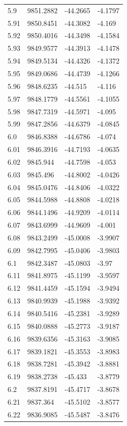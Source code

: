 \begin{table}[H]
\begin{tabular}{llll}
5.9 & 9851.2882 & -44.2665 & -4.1797 \\
5.91 & 9850.8451 & -44.3082 & -4.169 \\
5.92 & 9850.4016 & -44.3498 & -4.1584 \\
5.93 & 9849.9577 & -44.3913 & -4.1478 \\
5.94 & 9849.5134 & -44.4326 & -4.1372 \\
5.95 & 9849.0686 & -44.4739 & -4.1266 \\
5.96 & 9848.6235 & -44.515 & -4.116 \\
5.97 & 9848.1779 & -44.5561 & -4.1055 \\
5.98 & 9847.7319 & -44.5971 & -4.095 \\
5.99 & 9847.2856 & -44.6379 & -4.0845 \\
6.0 & 9846.8388 & -44.6786 & -4.074 \\
6.01 & 9846.3916 & -44.7193 & -4.0635 \\
6.02 & 9845.944 & -44.7598 & -4.053 \\
6.03 & 9845.496 & -44.8002 & -4.0426 \\
6.04 & 9845.0476 & -44.8406 & -4.0322 \\
6.05 & 9844.5988 & -44.8808 & -4.0218 \\
6.06 & 9844.1496 & -44.9209 & -4.0114 \\
6.07 & 9843.6999 & -44.9609 & -4.001 \\
6.08 & 9843.2499 & -45.0008 & -3.9907 \\
6.09 & 9842.7995 & -45.0406 & -3.9803 \\
6.1 & 9842.3487 & -45.0803 & -3.97 \\
6.11 & 9841.8975 & -45.1199 & -3.9597 \\
6.12 & 9841.4459 & -45.1594 & -3.9494 \\
6.13 & 9840.9939 & -45.1988 & -3.9392 \\
6.14 & 9840.5416 & -45.2381 & -3.9289 \\
6.15 & 9840.0888 & -45.2773 & -3.9187 \\
6.16 & 9839.6356 & -45.3163 & -3.9085 \\
6.17 & 9839.1821 & -45.3553 & -3.8983 \\
6.18 & 9838.7281 & -45.3942 & -3.8881 \\
6.19 & 9838.2738 & -45.433 & -3.8779 \\
6.2 & 9837.8191 & -45.4717 & -3.8678 \\
6.21 & 9837.364 & -45.5102 & -3.8577 \\
6.22 & 9836.9085 & -45.5487 & -3.8476 \\

\end{tabular}
\end{table}
